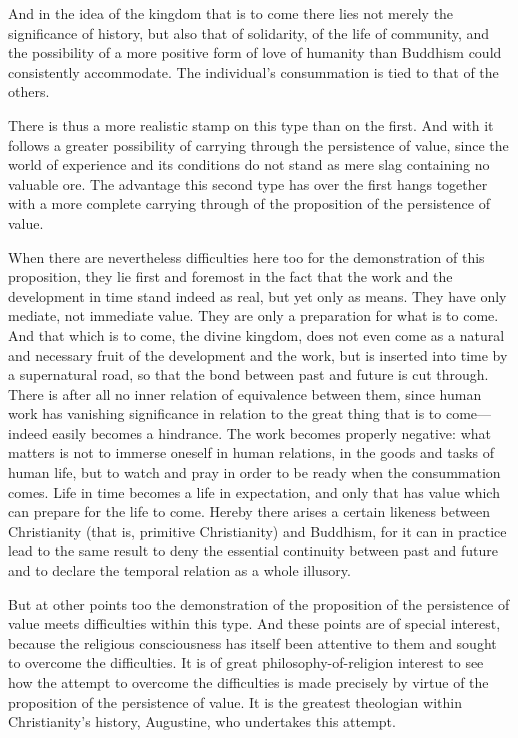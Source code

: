 \documentclass[12pt,a4paper]{book}
\newcommand{\opage}[1]{\marginnote{\footnotesize\textit{[#1]}}}
\begin{document}
And in the idea of the kingdom that is to come there lies not merely the significance of history,
but also that of solidarity, of the life of community, and the possibility of a more positive form
of love of humanity than Buddhism could consistently accommodate. The individual's consummation is
tied to that of the others.

There is thus a more realistic stamp on this type than on the first. And with it follows a greater
possibility of carrying through the persistence of value, since the world of experience and its
conditions do not stand as mere slag containing no valuable ore. The advantage this second type has
over the first hangs together with a more complete carrying through of the proposition of the
persistence of value.

When there are nevertheless difficulties here too for the demonstration of this proposition, they
lie first and foremost in the fact that the work and the development in time stand indeed as real,
but yet only as means. They have only mediate, not immediate value. They are only a preparation for
what is to come. And that which 
\opage{160}is to come, the divine kingdom, does not even come as a natural and
necessary fruit of the development and the work, but is inserted into time by a supernatural road,
so that the bond between past and future is cut through. There is after all no inner relation of
equivalence between them, since human work has vanishing significance in relation to the great
thing that is to come---indeed easily becomes a hindrance. The work becomes properly negative: what
matters is not to immerse oneself in human relations, in the goods and tasks of human life, but to
watch and pray in order to be ready when the consummation comes. Life in time becomes a life in
expectation, and only that has value which can prepare for the life to come. Hereby there arises a
certain likeness between Christianity (that is, primitive Christianity) and Buddhism, for it can in
practice lead to the same result to deny the essential continuity between past and future and to
declare the temporal relation as a whole illusory.

But at other points too the demonstration of the proposition of the persistence of value meets
difficulties within this type. And these points are of special interest, because the religious
consciousness has itself been attentive to them and sought to overcome the difficulties. It is of
great philosophy-of-religion interest to see how the attempt to overcome the difficulties is made
precisely by virtue of the proposition of the persistence of value. It is the greatest theologian
within Christianity's history, Augustine, who undertakes this attempt.
\end{document}
